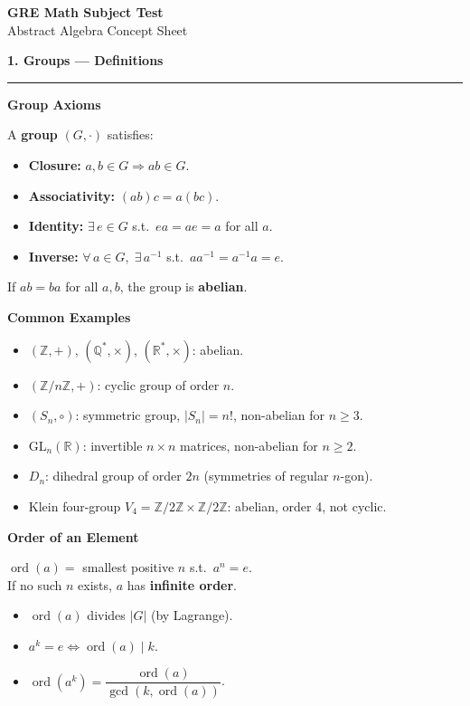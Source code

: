 \documentclass[10pt,twocolumn]{article}
\newcommand{\sect}[1]{\medskip\noindent\textbf{\large #1}\medskip\hrule\smallskip}
\newcommand{\subsect}[1]{\smallskip\noindent\textbf{#1}\par}
\begin{document}
\begin{center}
{\LARGE\bfseries GRE Math Subject Test}\\[2pt]
{\Large Abstract Algebra Concept Sheet}
\end{center}

\vspace{-4pt}

\sect{1. Groups --- Definitions}

\subsect{Group Axioms}
A \textbf{group} $(G,\cdot)$ satisfies:
\begin{itemize}[nosep,leftmargin=*]
\item \textbf{Closure:} $a,b\in G \Rightarrow ab\in G$.
\item \textbf{Associativity:} $(ab)c = a(bc)$.
\item \textbf{Identity:} $\exists\, e\in G$ s.t.\ $ea=ae=a$ for all $a$.
\item \textbf{Inverse:} $\forall\, a\in G,\;\exists\, a^{-1}$ s.t.\ $aa^{-1}=a^{-1}a=e$.
\end{itemize}
If $ab=ba$ for all $a,b$, the group is \textbf{abelian}.

\subsect{Common Examples}
\begin{itemize}[nosep,leftmargin=*]
\item $(\mathbb{Z},+)$, $(\mathbb{Q}^*,\times)$, $(\mathbb{R}^*,\times)$: abelian.
\item $(\mathbb{Z}/n\mathbb{Z},+)$: cyclic group of order $n$.
\item $(S_n, \circ)$: symmetric group, $|S_n|=n!$, non-abelian for $n\ge 3$.
\item $\text{GL}_n(\mathbb{R})$: invertible $n\times n$ matrices, non-abelian for $n\ge 2$.
\item $D_n$: dihedral group of order $2n$ (symmetries of regular $n$-gon).
\item Klein four-group $V_4 = \mathbb{Z}/2\mathbb{Z}\times\mathbb{Z}/2\mathbb{Z}$: abelian, order 4, not cyclic.
\end{itemize}

\subsect{Order of an Element}
$\operatorname{ord}(a) = $ smallest positive $n$ s.t.\ $a^n = e$.\\
If no such $n$ exists, $a$ has \textbf{infinite order}.
\begin{itemize}[nosep,leftmargin=*]
\item $\operatorname{ord}(a)$ divides $|G|$ (by Lagrange).
\item $a^k=e \iff \operatorname{ord}(a)\mid k$.
\item $\operatorname{ord}(a^k)=\dfrac{\operatorname{ord}(a)}{\gcd(k,\operatorname{ord}(a))}$.
\end{itemize}
\end{document}
